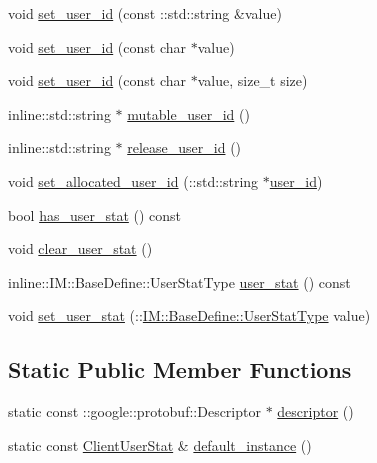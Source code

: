 \begin{DoxyCompactItemize}
\item 
void \hyperlink{class_i_m_1_1_base_define_1_1_client_user_stat_af2b26b522ee7df18ba6d2ca6fd0a05d6}{set\+\_\+user\+\_\+id} (const \+::std\+::string \&value)
\item 
void \hyperlink{class_i_m_1_1_base_define_1_1_client_user_stat_a7ac0064210d2e8b09a2a8a840dbfe82a}{set\+\_\+user\+\_\+id} (const char $\ast$value)
\item 
void \hyperlink{class_i_m_1_1_base_define_1_1_client_user_stat_a0fa052748559b72b64d56e91443239e0}{set\+\_\+user\+\_\+id} (const char $\ast$value, size\+\_\+t size)
\item 
inline\+::std\+::string $\ast$ \hyperlink{class_i_m_1_1_base_define_1_1_client_user_stat_a1c3a7f14e53eba44c9e4db531e16a53e}{mutable\+\_\+user\+\_\+id} ()
\item 
inline\+::std\+::string $\ast$ \hyperlink{class_i_m_1_1_base_define_1_1_client_user_stat_a063d689f25dba1cd14eb31df877e2aa6}{release\+\_\+user\+\_\+id} ()
\item 
void \hyperlink{class_i_m_1_1_base_define_1_1_client_user_stat_ad9d265007da291f07666baa2683f9894}{set\+\_\+allocated\+\_\+user\+\_\+id} (\+::std\+::string $\ast$\hyperlink{class_i_m_1_1_base_define_1_1_client_user_stat_a347989e1c4df35415d5f9eb32696e60b}{user\+\_\+id})
\item 
bool \hyperlink{class_i_m_1_1_base_define_1_1_client_user_stat_a649358dddf831ae87f1ae2c0dfe16e05}{has\+\_\+user\+\_\+stat} () const 
\item 
void \hyperlink{class_i_m_1_1_base_define_1_1_client_user_stat_a6c13a6f0137e1a24554f9269da222dd6}{clear\+\_\+user\+\_\+stat} ()
\item 
inline\+::\+I\+M\+::\+Base\+Define\+::\+User\+Stat\+Type \hyperlink{class_i_m_1_1_base_define_1_1_client_user_stat_ac9e15def809bdeae7d6549ef97dbe65e}{user\+\_\+stat} () const 
\item 
void \hyperlink{class_i_m_1_1_base_define_1_1_client_user_stat_a835c12be4e920032f5fb567564f53324}{set\+\_\+user\+\_\+stat} (\+::\hyperlink{namespace_i_m_1_1_base_define_adaf1a78b7a7db0195b92cc1786d93c01}{I\+M\+::\+Base\+Define\+::\+User\+Stat\+Type} value)
\end{DoxyCompactItemize}
\subsection*{Static Public Member Functions}
\begin{DoxyCompactItemize}
\item 
static const \+::google\+::protobuf\+::\+Descriptor $\ast$ \hyperlink{class_i_m_1_1_base_define_1_1_client_user_stat_a1866ac7ad905c5b5165c025cc46ea392}{descriptor} ()
\item 
static const \hyperlink{class_i_m_1_1_base_define_1_1_client_user_stat}{Client\+User\+Stat} \& \hyperlink{class_i_m_1_1_base_define_1_1_client_user_stat_aaafd32aa666bfd3dcb9ba97ccdb7f79b}{default\+\_\+instance} ()
\end{DoxyCompactItemize}
